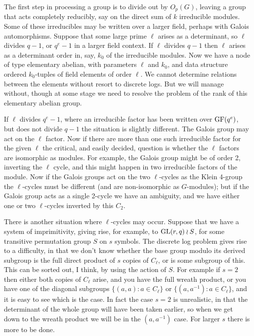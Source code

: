 The first step in processing a group is to divide out by $O_p(G)$, leaving a group that acts
completely reducibly, say on the direct sum of $k$ irreducible modules.  Some of these irreducibles
may be written over a larger field, perhaps with Galois automorphisms.  Suppose that some large prime $\ell$ arises as a determinant, so $\ell$ divides $q-1$, or $q^e-1$ in a larger field context.  If
$\ell$ divides $q-1$ then $\ell$ arises as a determinant order in, say, $k_0$ of the irreducible
modules.  Now we have a node of type elementary abelian, with parameters $\ell$ and $k_0$,
and data structure ordered $k_0$-tuples of field elements of order $\ell$.  We cannot determine
relations between the elements without resort to discrete logs.  But we will manage without, though
at some stage we need to resolve the problem of the rank of this elementary abelian group.

If $\ell$ divides $q^e-1$, where an irreducible factor has been written over ${\rm GF}(q^e)$, but does not
divide $q-1$ the situation is slightly different.  The Galois group may act on the $\ell$ factor.  Now if
there are more than one such irreducible factor for the given $\ell$ the critical, and easily decided,
question is whether the $\ell$ factors are isomorphic as modules.  For example, the Galois group
might be of order 2, inverting the $\ell$ cycle, and this might happen in two irreducible factors of
the module.  Now if the Galois groups act on the two $\ell$-cycles as the Klein 4-group the
$\ell$-cycles must be different (and are non-isomorphic as $G$-modules); but if the Galois group
acts as a single 2-cycle we have an ambiguity, and we have either one or two $\ell$-cycles
inverted by this $C_2$.

There is another situation where $\ell$-cycles may occur.  Suppose that we have a system of imprimitivity, giving rise, for example, to ${\rm GL}(r,q)\wr S$, for some transitive permutation group $S$ on
$s$ symbols.  The discrete log problem gives rise to a difficulty, in that we
don't know whether the base group modulo its derived subgroup is the full direct product of
$s$ copies of $C_\ell$, or is some subgroup of this.  This can be sorted out, I think, by
using the action of $S$.  For example if $s=2$ then either both copies of $C_\ell$ arise, and
you have the full wreath product, or you have one of the diagonal subgroups $\{(a,a):a\in C_\ell\}$ or 
$\{(a,a^{-1}):a\in C_\ell\}$, and it is easy to see which is the case.  In fact the case $s=2$ is
unrealistic, in that the determinant of the whole group will have been taken earlier, so when we
get down to the wreath product we will be in the $(a,a^{-1})$ case.  For larger $s$ there is more to be done.

